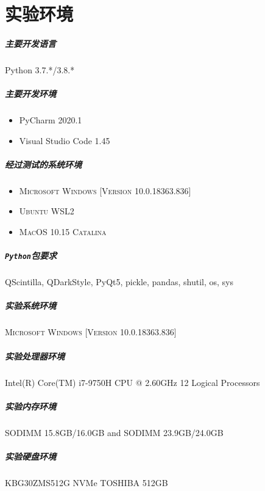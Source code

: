 \documentclass[UTF8]{ctexrep} %
\begin{document}
\chapter{实验环境}
\paragraph{主要开发语言}Python 3.7.*/3.8.*
\paragraph{主要开发环境}
\begin{itemize}
    \item PyCharm 2020.1
    \item Visual Studio Code 1.45
\end{itemize}
\paragraph{经过测试的系统环境}
\begin{itemize}
    \item \textsc{Microsoft Windows [Version 10.0.18363.836]}
    \item \textsc{Ubuntu WSL2}
    \item \textsc{MacOS 10.15 Catalina}
\end{itemize}
\paragraph{\texttt{Python}包要求}QScintilla, QDarkStyle, PyQt5, pickle, pandas, shutil, os, sys
\paragraph{实验系统环境} \textsc{Microsoft Windows [Version 10.0.18363.836]}
\paragraph{实验处理器环境} Intel(R) Core(TM) i7-9750H CPU @ 2.60GHz 12 Logical Processors
\paragraph{实验内存环境} SODIMM 15.8GB/16.0GB and SODIMM 23.9GB/24.0GB
\paragraph{实验硬盘环境} KBG30ZMS512G NVMe TOSHIBA 512GB
\end{document}
